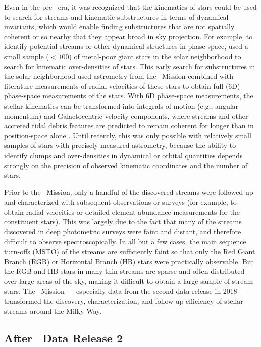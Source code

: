 \documentclass[final,5p,times,twocolumn,authoryear]{elsarticle}
\begin{document}
Even in the pre-\gaia\ era, it was recognized that the kinematics of stars could be used
to search for streams and kinematic substructures in terms of dynamical invariants,
which would enable finding substructures that are not spatially coherent or so nearby
that they appear broad in sky projection.
For example, to identify potential streams or other dynamical structures in phase-space,
\citet{Helmi:1999} used a small sample ($<100$) of metal-poor giant stars in the solar
neighborhood to search for kinematic over-densities of stars.
This early search for substructures in the solar neighborhood used astrometry from the
\hipparcos\ Mission \citep{todo} combined with literature measurements of radial
velocities of these stars to obtain full (6D) phase-space measurements of the stars.
With 6D phase-space measurements, the stellar kinematics can be transformed into
integrals of motion (e.g., angular momentum) and Galactocentric velocity components,
where streams and other accreted tidal debris features are predicted to remain coherent
for longer than in position-space alone \citep{Helmi:1999, Sanderson:XXXX}.
Until recently, this was only possible with relatively small samples of stars with
precisely-measured astrometry, because the ability to identify clumps and over-densities
in dynamical or orbital quantities depends strongly on the precision of observed
kinematic coordinates and the number of stars.

Prior to the \gaia\ Mission, only a handful of the discovered streams were followed up
and characterized with subsequent observations or surveys (for example, to obtain radial
velocities or detailed element abundance measurements for the constituent stars).
This was largely due to the fact that many of the streams discovered in deep photometric
surveys were faint and distant, and therefore difficult to observe spectroscopically.
In all but a few cases, the main sequence turn-offs (MSTO) of the streams are
sufficiently faint so that only the Red Giant Branch (RGB) or Horizontal Branch (HB)
stars were practically observable.
But the RGB and HB stars in many thin streams are sparse and often distributed over
large areas of the sky, making it difficult to obtain a large sample of stream stars.
The \gaia\ Mission --- especially data from the second data release in 2018 ---
transformed the discovery, characterization, and follow-up efficiency of stellar streams
around the Milky Way.


\subsection{After \gaia\ Data Release 2}
\end{document}

